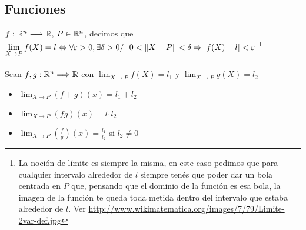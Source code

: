 \documentclass[a4paper,10pt]{article}
\begin{document}
\subsection{Funciones}
 $f:\mathbb{R}^{n} \longrightarrow \mathbb{R}$, $P \in \mathbb{R}^{n}$, decimos que \\ 
$\displaystyle\lim_{X \to P} f(X) = l \Leftrightarrow \forall \varepsilon > 0,\exists \delta>0 / \ \ 0 < \left\lVert X-P\right\rVert < \delta \Rightarrow \left\lvert f(X)-l\right\rvert < \varepsilon$
\footnote{La noción de límite es siempre la misma, en este caso pedimos que para cualquier intervalo alrededor de $l$ siempre tenés que poder dar un bola centrada en $P$ que, pensando que el dominio de la función es esa bola, la imagen de la función te queda toda metida dentro del intervalo que estaba alrededor de $l$. Ver \url{http://www.wikimatematica.org/images/7/79/Limite-2var-def.jpg}}
\\ \\
 Sean $f,g : \mathbb{R}^{n} \Longrightarrow \mathbb{R}$ con $\displaystyle\lim_{X \to P} f(X) = l_1$ y $\displaystyle\lim_{X \to P} g(X) = l_2$
\begin{itemize}
	\item $\displaystyle\lim_{X \to P} (f+g)(x) = l_1 + l_2$
	\item $\displaystyle\lim_{X \to P} (fg)(x) = l_1l_2$
	\item $\displaystyle\lim_{X \to P} \left(\frac{f}{g}\right)(x) = \frac{l_1}{l_2}$			si $l_2 \neq 0$
\end{itemize}
\ifversionlarga
\end{document}
